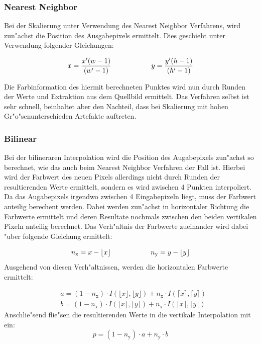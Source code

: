 \documentclass[a4paper]{article}
\begin{document}
\subsubsection{Nearest Neighbor}
Bei der Skalierung unter Verwendung des Nearest Neighbor Verfahrens, wird zun"achst die Position des Ausgabepixels ermittelt. Dies geschieht unter Verwendung folgender Gleichungen:

\begin{equation}
\label{EQ_findPoint}
	x = \frac{x' (w - 1)}{(w' - 1)} \hspace{2 cm} y = \frac{y' (h - 1)}{(h' - 1)}
\end{equation}

Die Farbinformation des hiermit berechneten Punktes wird nun durch Runden der Werte und Extraktion aus dem Quellbild ermittelt. Das Verfahren selbst ist sehr schnell, beinhaltet aber den Nachteil, dass bei Skalierung mit hohen Gr"o"senunterschieden Artefakte auftreten.


\subsubsection{Bilinear}
Bei der bilineraren Interpolation wird die Position des Augabepixels zun"achst so berechnet, wie das auch beim Nearest Neighbor Verfahren der Fall ist. Hierbei wird der Farbwert des neuen Pixels allerdings nicht durch Runden der resultierenden Werte ermittelt, sondern es wird zwischen 4 Punkten interpoliert. Da das Augabepixels irgendwo zwischen 4 Eingabepixeln liegt, muss der Farbwert anteilig berechent werden. Dabei werden zun"achst in horizontaler Richtung die Farbwerte ermittelt und deren Resultate nochmals zwischen den beiden vertikalen Pixeln anteilig berechnet.
Das Verh"altnis der Farbwerte zueinander wird dabei "uber folgende Gleichung ermittelt:

\begin{equation}
\label{EQ_ratio}
	n_\text{x} = x - \lfloor x \rfloor \hspace{2 cm} n_\text{y} = y - \lfloor y \rfloor
\end{equation}
Ausgehend von diesen Verh"altnissen, werden die horizontalen Farbwerte ermittelt:

\begin{equation}
\label{EQ_horizontal_interpolation}
	\begin{aligned}
	& a = (1 - n_\text{x}) \cdot I(\lfloor x \rfloor, \lfloor y \rfloor) + n_\text{x} \cdot I (\lceil x \rceil, \lceil y \rceil)\\
	& b = (1 - n_\text{x}) \cdot I(\lfloor x \rfloor, \lceil y \rceil) + n_\text{x} \cdot I (\lceil x \rceil, \lceil y \rceil)
	\end{aligned}
\end{equation}
Anschlie"send flie"sen die resultierenden Werte in die vertikale Interpolation mit ein:
\begin{equation}
\label{EQ_vertical_interpolation}
	p = (1 - n_\text{y} ) \cdot a + n_\text{y} \cdot b
\end{equation}
\end{document}
